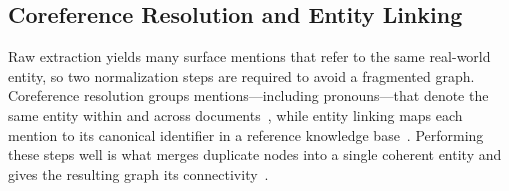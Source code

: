 \subsection{Coreference Resolution and Entity Linking}

Raw extraction yields many surface mentions that refer to the same real-world
entity, so two normalization steps are required to avoid a fragmented graph.
Coreference resolution groups mentions---including pronouns---that denote the same
entity within and across documents~\cite{lee2017coref}, while entity linking maps
each mention to its canonical identifier in a reference knowledge
base~\cite{shen2015entitylinking}. Performing these steps well is what merges
duplicate nodes into a single coherent entity and gives the resulting graph its
connectivity~\cite{shen2015entitylinking, ji2021kgsurvey}.
